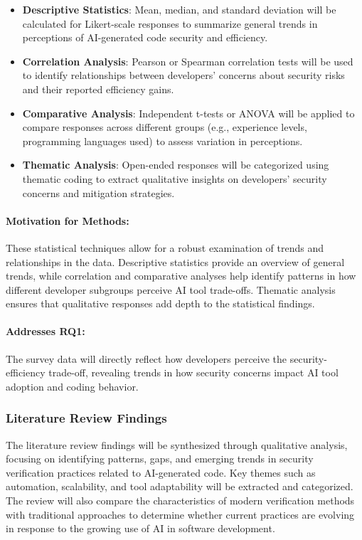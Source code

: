 \begin{itemize}
    \item \textbf{Descriptive Statistics}: Mean, median, and standard deviation will be calculated for Likert-scale responses to summarize general trends in perceptions of AI-generated code security and efficiency.
    \item \textbf{Correlation Analysis}: Pearson or Spearman correlation tests will be used to identify relationships between developers’ concerns about security risks and their reported efficiency gains.
    \item \textbf{Comparative Analysis}: Independent t-tests or ANOVA will be applied to compare responses across different groups (e.g., experience levels, programming languages used) to assess variation in perceptions.
    \item \textbf{Thematic Analysis}: Open-ended responses will be categorized using thematic coding to extract qualitative insights on developers' security concerns and mitigation strategies.
\end{itemize}

\paragraph{Motivation for Methods:} These statistical techniques allow for a robust examination of trends and relationships in the data. Descriptive statistics provide an overview of general trends, while correlation and comparative analyses help identify patterns in how different developer subgroups perceive AI tool trade-offs. Thematic analysis ensures that qualitative responses add depth to the statistical findings.

\paragraph{Addresses RQ1:} The survey data will directly reflect how developers perceive the security-efficiency trade-off, revealing trends in how security concerns impact AI tool adoption and coding behavior.

\subsubsection{Literature Review Findings}
The literature review findings will be synthesized through qualitative analysis, focusing on identifying patterns, gaps, and emerging trends in security verification practices related to AI-generated code. Key themes such as automation, scalability, and tool adaptability will be extracted and categorized. The review will also compare the characteristics of modern verification methods with traditional approaches to determine whether current practices are evolving in response to the growing use of AI in software development.
